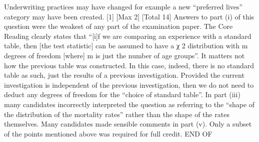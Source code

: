 Underwriting practices may have changed for example a new “preferred lives”
category may have been created.
[1]
[Max 2]
[Total 14]
Answers to part (i) of this question were the weakest of any part of the
examination paper. The Core Reading clearly states that “[i]f we are
comparing an experience with a standard table, then [the test statistic] can be
assumed to have a χ 2 distribution with m degrees of freedom [where] m is just
the number of age groups”. It matters not how the previous table was
constructed. In this case, indeed, there is no standard table as such, just the
results of a previous investigation. Provided the current investigation is
independent of the previous investigation, then we do not need to deduct any
degrees of freedom for the “choice of standard table”. In part (iii) many
candidates incorrectly interpreted the question as referring to the “shape of
the distribution of the mortality rates” rather than the shape of the rates
themselves. Many candidates made sensible comments in part (v). Only a
subset of the points mentioned above was required for full credit.
END OF 

